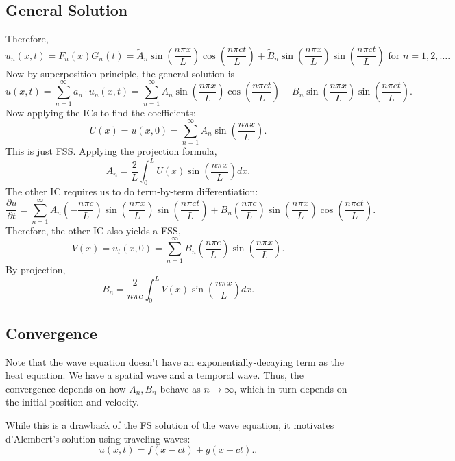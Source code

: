 \documentclass[class=article,crop=false]{standalone}
\begin{document}
\subsection{General Solution}
Therefore,
\[
	u_n(x,t) = F_n(x)G_n(t) = \tilde{ A}_n \sin \left( \frac{ n\pi x}{ L} \right) \cos \left( \frac{ n\pi c t}{ L} \right) + \tilde{ B}_n \sin \left( \frac{ n\pi x}{ L} \right) \sin \left( \frac{ n\pi c t}{ L} \right) \text{ for } n=1,2,\ldots  
.\]
Now by superposition principle, the general solution is
\[
	u(x,t) = \sum_{ n= 1}^{\infty} a_n \cdot u_n(x,t) = \sum_{ n= 1}^{\infty} A_n \sin \left( \frac{ n\pi x}{ L} \right) \cos \left( \frac{ n\pi c t}{ L} \right) + B_n \sin \left( \frac{ n\pi x}{ L} \right) \sin \left( \frac{ n\pi c t}{ L} \right) 
.\]
Now applying the ICs to find the coefficients:
\[
	U(x) = u(x,0) = \sum_{ n= 1}^{\infty} A_n \sin \left( \frac{ n\pi x}{ L} \right) 
.\] 
This is just FSS. Applying the projection formula,
\[
	A_n = \frac{2}{L} \int_{0}^{L}  U(x) \sin \left( \frac{ n\pi x}{ L} \right) dx 
.\] 
The other IC requires us to do term-by-term differentiation:
\[
	\frac{\partial u}{\partial t} = \sum_{ n= 1}^{\infty} A_n\left(-\frac{n \pi c}{L } \right) \sin \left( \frac{ n\pi x}{ L} \right) \sin \left( \frac{ n\pi c t}{ L} \right) + B_n \left( \frac{n \pi c}{L } \right) \sin \left( \frac{ n\pi x}{ L} \right) \cos \left( \frac{ n\pi c t}{ L} \right) 
.\]
Therefore, the other IC also yields a FSS,
\[
	V(x) = u_t(x,0) = \sum_{ n= 1}^{\infty} B_n\left( \frac{n \pi c}{ L} \right) \sin \left( \frac{ n\pi x}{ L} \right)  
.\]
By projection,
\[
	B_n = \frac{2}{n \pi c} \int_{0}^{L} V(x) \sin \left( \frac{ n\pi x}{ L} \right) dx 
.\] 
\subsection{Convergence}
Note that the wave equation doesn't have an exponentially-decaying term as the heat equation. We have a spatial wave and a temporal wave. Thus, the convergence depends on how $ A_n, B_n$ behave as $ n \to \infty $, which in turn depends on the initial position and velocity.

While this is a drawback of the FS solution of the wave equation, it motivates d'Alembert's solution using traveling waves:
\[
	u(x,t) = f(x-ct) + g(x + c t).
.\] 
\end{document}
